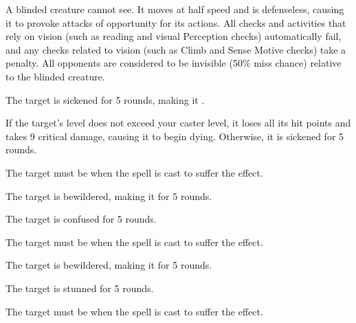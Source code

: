 A blinded creature cannot see. It moves at half speed and is defenseless, causing it to provoke attacks of opportunity for its actions. All checks and activities that rely on vision (such as reading and visual Perception checks) automatically fail, and any checks related to vision (such as Climb and Sense Motive checks) take a  penalty. All opponents are considered to be invisible (50\% miss chance) relative to the blinded creature.

\begin{spellhealthy}
    The target is sickened for 5 rounds, making it \vulnerable.
\end{spellhealthy}
\begin{spellblood}
    If the target's level does not exceed your caster level, it loses all its hit points and takes 9 critical damage, causing it to begin dying. Otherwise, it is sickened for 5 rounds.
\end{spellblood}
\spellnotes The target must be \bloodied when the spell is cast to suffer the \bloodied effect.

\begin{spellhealthy}
    The target is bewildered, making it \vulnerable for 5 rounds.
\end{spellhealthy}
\begin{spellblood}
    The target is confused for 5 rounds. \confusionexplanation
\end{spellblood}
\spellnotes The target must be \bloodied when the spell is cast to suffer the \bloodied effect.

\begin{spellhealthy}
    The target is bewildered, making it \vulnerable for 5 rounds.
\end{spellhealthy}
\begin{spellblood}
    The target is stunned for 5 rounds.
\end{spellblood}
\spellnotes The target must be \bloodied when the spell is cast to suffer the \bloodied effect.


